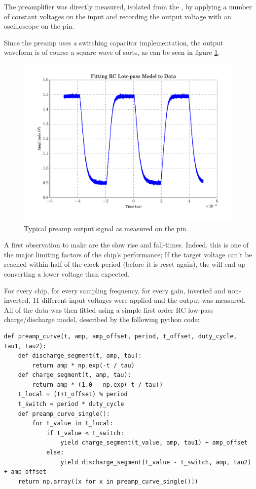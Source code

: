 The preamplifier was directly  measured, isolated from the \sdm, by applying a
number of constant voltages on the input and recording the output voltage with
an oscilloscope on the  pin.

Since the  preamp  uses  a  switching  capacitor  implementation,  the  output
waveform is of  course  a  square  wave  of  sorts,  as  can be seen in figure
\ref{fig:preamp_waveform}.

\begin{figure}
    \centering
    \includegraphics[width=.7\linewidth]{images/plots/preamp_waveform.pdf}
    \caption{Typical preamp output signal as measured on the  pin.}
    \label{fig:preamp_waveform}
\end{figure}

A first observation to make are the slow rise and fall-times. Indeed,  this is
one  of the major limiting factors of the chip's performance;  If  the  target
voltage can't be reached within half of the clock period (before it  is  reset
again),  the  \sdm will end up  converting  a  lower  voltage  than  expected.

For  every  chip,  for  every sampling frequency, for every gain, inverted and
non-inverted,  11  different  input voltages were applied and the  output  was
measured.  All  of  the  data  was  then fitted using a simple first order  RC
low-pass charge/discharge model, described by the following python code:

\begin{verbatim}
def preamp_curve(t, amp, amp_offset, period, t_offset, duty_cycle, tau1, tau2):
    def discharge_segment(t, amp, tau):
        return amp * np.exp(-t / tau)
    def charge_segment(t, amp, tau):
        return amp * (1.0 - np.exp(-t / tau))
    t_local = (t+t_offset) % period
    t_switch = period * duty_cycle
    def preamp_curve_single():
        for t_value in t_local:
            if t_value < t_switch:
                yield charge_segment(t_value, amp, tau1) + amp_offset
            else:
                yield discharge_segment(t_value - t_switch, amp, tau2) + amp_offset
    return np.array([x for x in preamp_curve_single()])
\end{verbatim}

